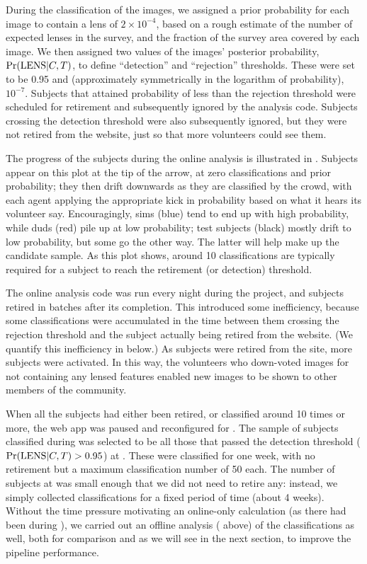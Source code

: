 \documentclass[useAMS,usenatbib,a4paper]{mn2e}
\begin{document}
During the \StageOne classification of the \cfhtls images, we assigned a prior
probability for each image to contain a lens of $2\times10^{-4}$, based on a
rough estimate of the number of expected lenses in the survey, and the fraction
of the survey area covered by each image. We then assigned two values of the
images' posterior probability, ${\rm Pr}({\rm LENS}|C,T)$, to define ``detection'' and
``rejection'' thresholds. These were set to be 0.95 and (approximately
symmetrically in the logarithm of probability), $10^{-7}$. Subjects that
attained probability of less than the rejection threshold were scheduled for
retirement and subsequently ignored by the analysis code. Subjects crossing the
detection threshold were also subsequently ignored, but they were not
retired from the website, just so that more volunteers could see them.

The progress of the subjects during the online analysis is illustrated in
. Subjects appear on this plot at the tip of
the arrow, at zero classifications and prior probability; they then drift
downwards as they are classified by the crowd, with each agent applying the
appropriate kick in probability based on what it hears its volunteer say.
Encouragingly, sims (blue) tend to end up with high probability, while duds
(red) pile up at low probability; test subjects (black) mostly drift to low
probability, but some go the other way. The latter will help make up the
candidate sample. As this plot shows, around 10 classifications are typically
required for a subject to reach the retirement (or detection) threshold.

The online analysis code was run every night during the project, and subjects retired
in batches after its completion. This introduced some inefficiency, because
some classifications were accumulated in the time between them crossing the
rejection threshold and the subject actually being retired from the website.
(We quantify this inefficiency in  below.)
As subjects were retired from the site, more subjects were activated. In this
way, the volunteers who down-voted images for not containing any lensed
features enabled new images to be shown to other members of the community.

When all the subjects had either been retired, or classified around 10 times or
more, the web app was paused and reconfigured for \StageTwo. The sample of
subjects classified during \StageTwo was selected to be all those that passed
the detection threshold (${\rm Pr}({\rm LENS}|C,T) > 0.95$) at \StageOne. These were
classified for one week, with no retirement but a maximum classification number
of 50 each. The number of subjects at \StageTwo was small enough that we did not
need to retire any: instead, we simply collected classifications for a fixed
period of time (about 4 weeks). Without the time pressure motivating an
online-only calculation (as there had been during \StageOne), we carried out an
offline analysis ( above) of the  \StageTwo
classifications as well, both  for comparison and as we will see in the next
section, to improve the pipeline performance.
\end{document}

